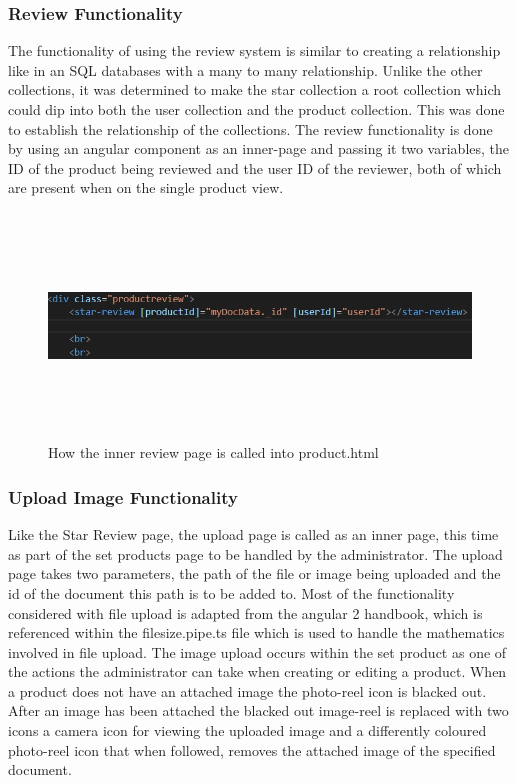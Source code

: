 \subsubsection{Review Functionality}
The functionality of using the review system is similar to creating a relationship like in an SQL databases with a many to many relationship. Unlike the other collections, it was determined to make the star collection a root collection which could dip into both the user collection and the product collection. This was done to establish the relationship of the collections. The review functionality is done by using an angular component as an inner-page and passing it two variables, the ID of the product being reviewed and the user ID of the reviewer, both of which are present when on the single product view. 
\begin{figure}[h!]
    	\caption{How the inner review page is called into product.html}
	\centering
	\includegraphics[width=15cm, height=6cm]{images/reviewcall.png}
\end{figure}


\subsubsection{Upload Image Functionality}
Like the Star Review page, the upload page is called as an inner page, this time as part of the set products page to be handled by the administrator. The upload page takes two parameters, the path of the file or image being uploaded and the id of the document this path is to be added to. Most of the functionality considered with file upload is adapted from the angular 2 handbook, which is referenced within the filesize.pipe.ts file which is used to handle the mathematics involved in file upload. The image upload occurs within the set product as one of the actions the administrator can take when creating or editing a product. When a product does not have an attached image the photo-reel icon is blacked out. After an image has been attached the blacked out image-reel is replaced with two icons a camera icon for viewing the uploaded image and a differently coloured photo-reel icon that when followed, removes the attached image of the specified document.

